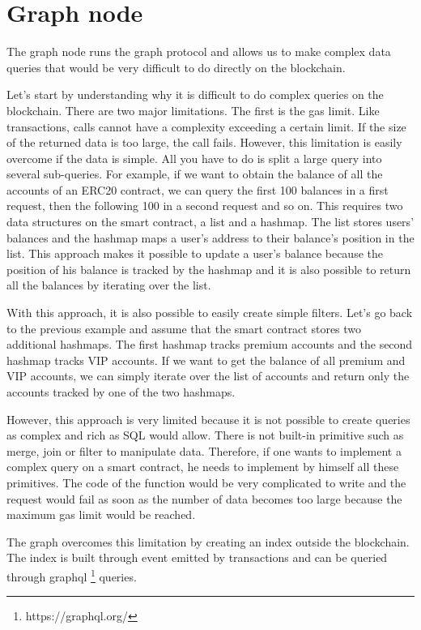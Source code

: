 \documentclass[a4paper,11pt,oneside]{report}
\begin{document}
\section{Graph node}
The graph node runs the graph protocol and allows us to make complex data queries that would be very difficult to do directly on the blockchain.

Let's start by understanding why it is difficult to do complex queries on the blockchain. There are two major limitations. The first is the gas limit. Like transactions, calls cannot have a complexity exceeding a certain limit. If the size of the returned data is too large, the call fails. However, this limitation is easily overcome if the data is simple. All you have to do is split a large query into several sub-queries. For example, if we want to obtain the balance of all the accounts of an ERC20 contract, we can query the first 100 balances in a first request, then the following 100 in a second request and so on. This requires two data structures on the smart contract, a list and a hashmap. The list stores users' balances and the hashmap maps a user's address to their balance's position in the list. This approach makes it possible to update a user's balance because the position of his balance is tracked by the hashmap and it is also possible to return all the balances by iterating over the list.

With this approach, it is also possible to easily create simple filters. Let's go back to the previous example and assume that the smart contract stores two additional hashmaps. The first hashmap tracks premium accounts and the second hashmap tracks VIP accounts. If we want to get the balance of all premium and VIP accounts, we can simply iterate over the list of accounts and return only the accounts tracked by one of the two hashmaps.

However, this approach is very limited because it is not possible to create queries as complex and rich as SQL would allow. There is not built-in primitive such as merge, join or filter to manipulate data. Therefore, if one wants to implement a complex query on a smart contract, he needs to implement by himself all these primitives. The code of the function would be very complicated to write and the request would fail as soon as the number of data becomes too large because the maximum gas limit would be reached.

The graph overcomes this limitation by creating an index outside the blockchain. The index is built through event emitted by transactions and can be queried through graphql \footnote{https://graphql.org/} queries.
\end{document}

